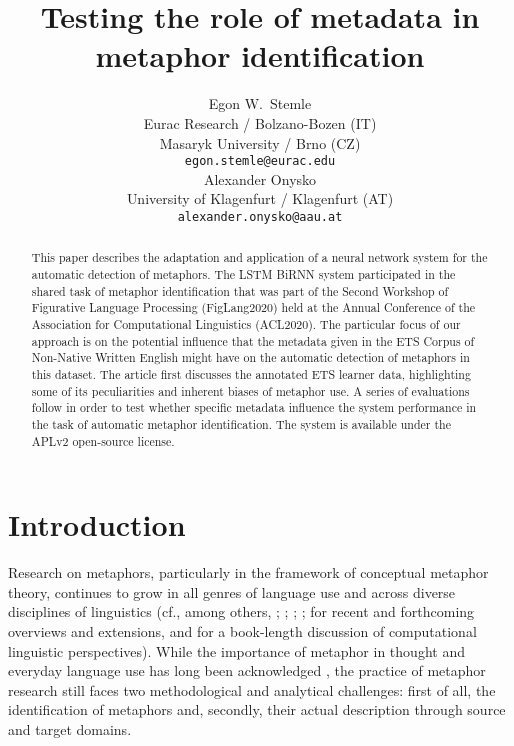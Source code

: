 \documentclass[11pt,a4paper]{article}
\title{Testing the role of metadata in metaphor identification}
\author{Egon W.~Stemle \\
  Eurac Research / Bolzano-Bozen (IT) \\
  Masaryk University / Brno (CZ) \\
  {\tt egon.stemle@eurac.edu} \\\And
  Alexander Onysko \\
  University of  Klagenfurt / Klagenfurt (AT) \\
  {\tt alexander.onysko@aau.at} \\}
\date{}
\begin{document}
\maketitle
\begin{abstract}
This paper describes the adaptation and application of a neural network system for the automatic detection of metaphors. The  LSTM BiRNN system participated in the shared task of metaphor identification that was part of the Second Workshop of Figurative Language Processing (FigLang2020) held at the Annual Conference of the Association for Computational Linguistics (ACL2020). The particular focus of our approach is on the potential influence that the metadata given in the ETS Corpus of Non-Native Written English might have on the automatic detection of metaphors in this dataset. The article first discusses the annotated ETS learner data, highlighting some of its peculiarities and inherent biases of metaphor use. A series of evaluations follow in order to test whether specific metadata influence the system performance in the task of automatic metaphor identification. The system is available under the APLv2 open-source license. 
\end{abstract}



\section{Introduction}

Research on metaphors, particularly in the framework of conceptual metaphor theory, continues to grow in all genres of language use and across diverse disciplines of linguistics (cf., among others, \citealp{littlemore:2019:MetaphorsMindSources}; \citealp{gibbsjr:2017:MetaphorWarsConceptual}; \citealp{charteris-black:2016:FireMetaphorsDiscourses}; \citealp{kovecses:2020:ExtendedConceptualMetaphor}; \citealp{callies-degani::MetaphorLanguageCulture} for recent and forthcoming overviews and extensions, and \citealp{veale-EtAl:2016:MetaphorComputationalPerspective} for a book-length discussion of computational linguistic perspectives). While the importance of metaphor in thought and everyday language use has long been acknowledged \citep{LakoffJohnson80}, the practice of metaphor research still faces two methodological and analytical challenges: first of all, the identification of metaphors and, secondly, their actual description through source and target domains. 
\end{document}
